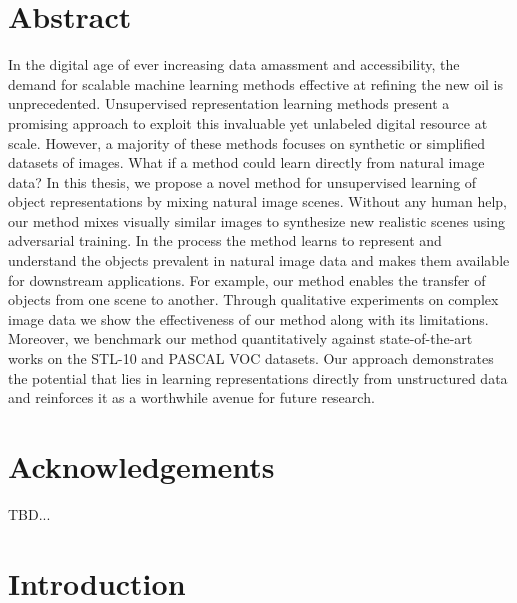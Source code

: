 \documentclass[a4paper,12pt]{report}
\begin{document}
\chapter*{Abstract}
In the digital age of ever increasing data amassment and accessibility, the demand for scalable machine learning methods effective at refining the new oil is unprecedented. Unsupervised representation learning methods present a promising approach to exploit this invaluable yet unlabeled digital resource at scale. However, a majority of these methods focuses on synthetic or simplified datasets of images. What if a method could learn directly from natural image data? In this thesis, we propose a novel method for unsupervised learning of object representations by mixing natural image scenes. Without any human help, our method mixes visually similar images to synthesize new realistic scenes using adversarial training. In the process the method learns to represent and understand the objects prevalent in natural image data and makes them available for downstream applications. For example, our method enables the transfer of objects from one scene to another. Through qualitative experiments on complex image data we show the effectiveness of our method along with its limitations. Moreover, we benchmark our method quantitatively against state-of-the-art works on the STL-10 and PASCAL VOC datasets. Our approach demonstrates the potential that lies in learning representations directly from unstructured data and reinforces it as a worthwhile avenue for future research.


\newpage
\chapter*{Acknowledgements}
TBD...


\newpage
\tableofcontents
\newpage
%

\chapter{Introduction}
\end{document}
